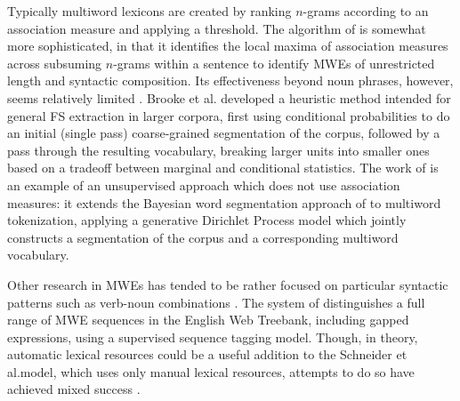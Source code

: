 \documentclass[11pt,letterpaper]{article}
\makeatletter
\def \al {al.\@ }
\makeatother
\begin{document}
Typically multiword lexicons are created by ranking $n$-grams according to an association measure and applying a threshold. The algorithm of  is somewhat more sophisticated, in that it identifies the local maxima of association measures across subsuming $n$-grams within a sentence to identify MWEs of unrestricted length and syntactic composition. Its effectiveness beyond noun phrases, however, seems relatively limited \cite{Ramisch12}. Brooke et \al {} developed a heuristic method intended for general FS extraction in larger corpora, first using conditional probabilities to do an initial (single pass) coarse-grained segmentation of the corpus, followed by a pass through the resulting vocabulary, breaking larger units into smaller ones based on a tradeoff between marginal and conditional statistics. The work of  is an example of an unsupervised approach which does not use association measures: it extends the Bayesian word segmentation approach of  to multiword tokenization, applying a generative Dirichlet Process model which jointly constructs a segmentation of the corpus and a corresponding multiword vocabulary.

Other research in MWEs has tended to be rather focused on particular syntactic patterns such as verb-noun combinations \cite{Fazly09}. The system of  distinguishes a full range of MWE sequences in the English Web Treebank, including gapped expressions, using a supervised sequence tagging model. Though, in theory, automatic lexical resources could be a useful addition to the Schneider et \al model, which uses only manual lexical resources, attempts to do so have achieved mixed success \cite{Riedl16}. 
\end{document}
